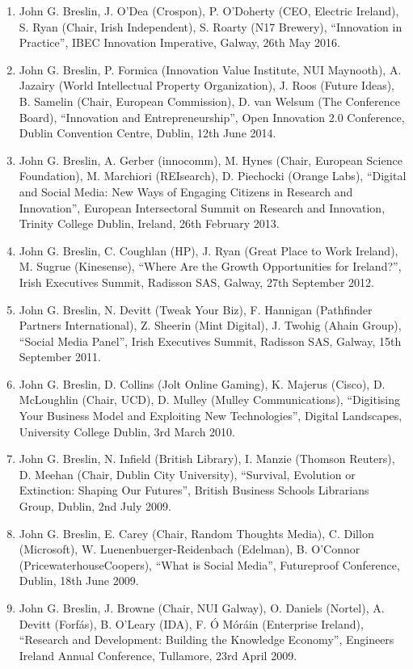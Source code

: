 \documentclass[10pt,a4paper]{res} %
\begin{document}
\begin{resume}
\begin{enumerate}
\item John G. Breslin, J. O'Dea (Crospon), P. O'Doherty (CEO, Electric Ireland), S. Ryan (Chair, Irish Independent), S. Roarty (N17 Brewery), ``Innovation in Practice'', IBEC Innovation Imperative, Galway, 26th May 2016.
\item John G. Breslin, P. Formica (Innovation Value Institute, NUI Maynooth), A. Jazairy (World Intellectual Property Organization), J. Roos (Future Ideas), B. Samelin (Chair, European Commission), D. van Welsum (The Conference Board), ``Innovation and Entrepreneurship'', Open Innovation 2.0 Conference, Dublin Convention Centre, Dublin, 12th June 2014.
\item John G. Breslin, A. Gerber (innocomm), M. Hynes (Chair, European Science Foundation), M. Marchiori (REIsearch), D. Piechocki (Orange Labs), ``Digital and Social Media: New Ways of Engaging Citizens in Research and Innovation'', European Intersectoral Summit on Research and Innovation, Trinity College Dublin, Ireland, 26th February 2013.
\item John G. Breslin, C. Coughlan (HP), J. Ryan (Great Place to Work Ireland), M. Sugrue (Kinesense), ``Where Are the Growth Opportunities for Ireland?'', Irish Executives Summit, Radisson SAS, Galway, 27th September 2012.
\item John G. Breslin, N. Devitt (Tweak Your Biz), F. Hannigan (Pathfinder Partners International), Z. Sheerin (Mint Digital), J. Twohig (Ahain Group), ``Social Media Panel'', Irish Executives Summit, Radisson SAS, Galway, 15th September 2011.
\item John G. Breslin, D. Collins (Jolt Online Gaming), K. Majerus (Cisco), D. McLoughlin (Chair, UCD), D. Mulley (Mulley Communications), ``Digitising Your Business Model and Exploiting New Technologies'', Digital Landscapes, University College Dublin, 3rd March 2010.
\item John G. Breslin, N. Infield (British Library), I. Manzie (Thomson Reuters), D. Meehan (Chair, Dublin City University), ``Survival, Evolution or Extinction: Shaping Our Futures'', British Business Schools Librarians Group, Dublin, 2nd July 2009.
\item John G. Breslin, E. Carey (Chair, Random Thoughts Media), C. Dillon (Microsoft), W. Luenenbuerger-Reidenbach (Edelman), B. O'Connor (PricewaterhouseCoopers), ``What is Social Media'', Futureproof Conference, Dublin, 18th June 2009.
\item John G. Breslin, J. Browne (Chair, NUI Galway), O. Daniels (Nortel), A. Devitt (Forf\'{a}s), B. O'Leary (IDA), F. \'{O} M\'{o}r\'{a}in (Enterprise Ireland), ``Research and Development: Building the Knowledge Economy'', Engineers Ireland Annual Conference, Tullamore, 23rd April 2009.

\end{enumerate}
\end{resume}
\end{document}
